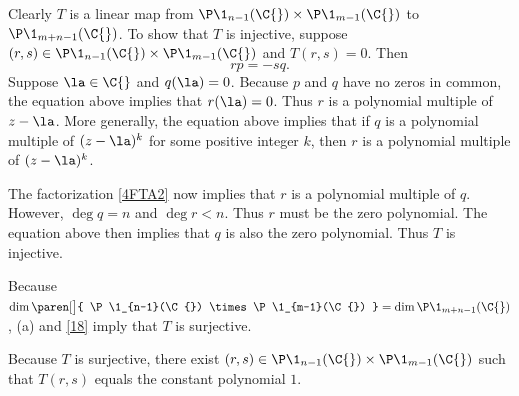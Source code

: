 \begin{Solution}
\begin{subtheorem}
\item
Clearly $T$ is a linear map from $\P\1_{n-1}(\C{}) \times \P\1_{m-1}(\C{})$ to ${\P\1_{m+n-1}(\C{})}$. To show that $T$ is injective, suppose
$(r, s) \in \P\1_{n-1}(\C{}) \times \P\1_{m-1}(\C{})$ and $T(r, s) = 0$. Then
\[
rp = -sq.
\]
Suppose $\la \in \C{}$ and $q(\la) = 0$. Because $p$ and $q$ have no zeros in common, the equation above implies that $r(\la) = 0$. Thus $r$ is a polynomial multiple of $z-\la$. More generally, the equation above implies that if $q$ is a polynomial multiple of $(z-\la)^k$ for some positive integer $k$, then $r$ is a polynomial multiple of $(z - \la)^k$.

The factorization \ref{4FTA2} now implies that $r$ is a polynomial multiple of $q$. However, $\deg q = n$ and
$\deg r < n$. Thus $r$ must be the zero polynomial. The equation above then implies that $q$ is also the zero polynomial. Thus $T$ is injective.

\item
Because $\dim \paren[\big]{ \P\1_{n-1}(\C{}) \times \P\1_{m-1}(\C{}) } = \dim \P\1_{m+n-1}(\C{})$, (a) and \ref{18} imply that $T$ is surjective.

\item
Because $T$ is surjective, there exist $(r, s) \in \P\1_{n-1}(\C{}) \times \P\1_{m-1}(\C{})$ such that $T(r, s)$ equals the constant polynomial $1$.
\end{subtheorem}
\end{Solution}

